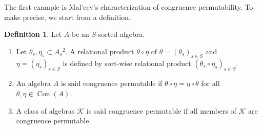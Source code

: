 \documentclass[a4paper,10pt]{article}
\theoremstyle{definition}
\newtheorem{df}{Definition}[section]
\DeclareMathOperator{\Con}{Con}
\newcommand\K{\mathcal{K}}
\begin{document}
The first example is Mal'cev's characterization of congruence permutability.
To make precise, we start from a definition.
\begin{df}
Let $A$ be an $S$-sorted algebra.
\begin{enumerate}
\item
Let $\theta_s,\eta_s\subset A_s{}^2$.
A relational product $\theta\circ\eta$ of $\theta=(\theta_s)_{s\in S}$ and $\eta=(\eta_s)_{s\in S}$
is defined by sort-wise relational product $(\theta_s\circ\eta_s)_{s\in S}$. 
\item
An algebra $A$ is said congruence  permutable if $\theta\circ\eta=\eta\circ\theta$
for all $\theta,\eta\in\Con(A)$.
\item
A class of algebras $\K$ is said congruence permutable if all members of
$\K$ are congruence permutable.
\end{enumerate}
\end{df}
\end{document}
